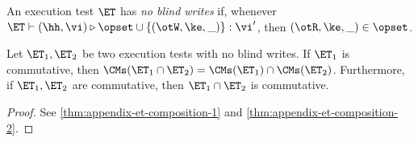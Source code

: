\begin{definition}
\label{def:noblidwrites}
An execution test $\ET$ has \emph{no blind writes} if, whenever $\ET \vdash (\hh, \vi) \triangleright \opset \cup \{(\otW, \ke, \_)\} : \vi'$, 
then $(\otR, \ke, \_) \in \opset$.
\end{definition}

\begin{theorem}
Let $\ET_1, \ET_2$ be two execution tests with no blind writes. If $\ET_1$ is commutative, 
then $\CMs(\ET_1 \cap \ET_2) = \CMs(\ET_1) \cap \CMs(\ET_2)$. 
Furthermore, if $\ET_1, \ET_2$ are commutative, then $\ET_1 \cap \ET_2$ 
is commutative.
\end{theorem}
\begin{proof}
See \cref{thm:appendix-et-composition-1} and \cref{thm:appendix-et-composition-2}.
\end{proof}



